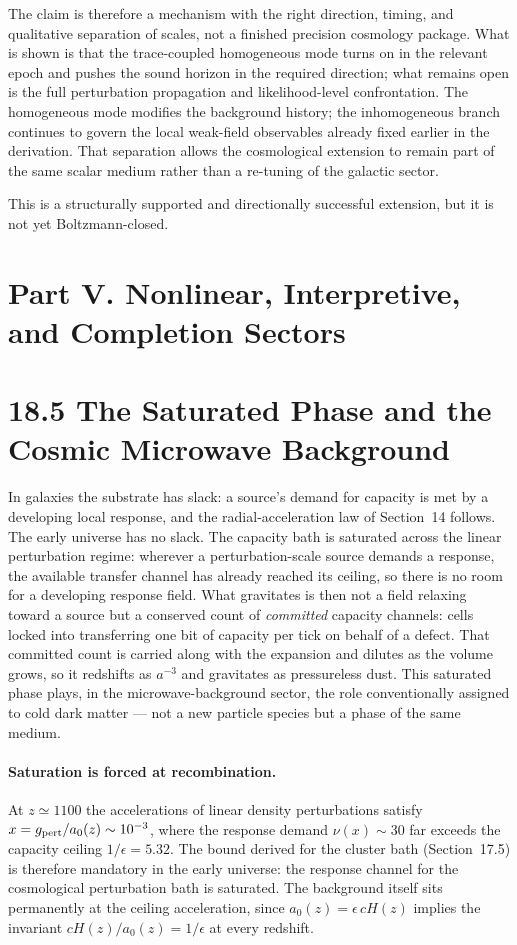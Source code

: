 \documentclass[11pt]{article}
\begin{document}
The claim is therefore a mechanism with the right direction, timing, and qualitative separation of scales, not a finished precision cosmology package. What is shown is that the trace-coupled homogeneous mode turns on in the relevant epoch and pushes the sound horizon in the required direction; what remains open is the full perturbation propagation and likelihood-level confrontation. The homogeneous mode modifies the background history; the inhomogeneous branch continues to govern the local weak-field observables already fixed earlier in the derivation. That separation allows the cosmological extension to remain part of the same scalar medium rather than a re-tuning of the galactic sector.

This is a structurally supported and directionally successful extension, but it is not yet Boltzmann-closed.

\section*{Part V. Nonlinear, Interpretive, and Completion Sectors}

\section{18.5 The Saturated Phase and the Cosmic Microwave Background}

In galaxies the substrate has slack: a source's demand for capacity is met by a developing local response, and the radial-acceleration law of Section~14 follows. The early universe has no slack. The capacity bath is saturated across the linear perturbation regime: wherever a perturbation-scale source demands a response, the available transfer channel has already reached its ceiling, so there is no room for a developing response field. What gravitates is then not a field relaxing toward a source but a conserved count of \emph{committed} capacity channels: cells locked into transferring one bit of capacity per tick on behalf of a defect. That committed count is carried along with the expansion and dilutes as the volume grows, so it redshifts as $a^{-3}$ and gravitates as pressureless dust. This saturated phase plays, in the microwave-background sector, the role conventionally assigned to cold dark matter --- not a new particle species but a phase of the same medium.

\paragraph{Saturation is forced at recombination.}
At $z\simeq1100$ the accelerations of linear density perturbations satisfy $x=g_{\rm pert}/a_0(z)\sim10^{-3}$, where the response demand $\nu(x)\sim30$ far exceeds the capacity ceiling $1/\epsilon=5.32$. The bound derived for the cluster bath (Section~17.5) is therefore mandatory in the early universe: the response channel for the cosmological perturbation bath is saturated. The background itself sits permanently at the ceiling acceleration, since $a_0(z)=\epsilon\,cH(z)$ implies the invariant $cH(z)/a_0(z)=1/\epsilon$ at every redshift.
\end{document}
